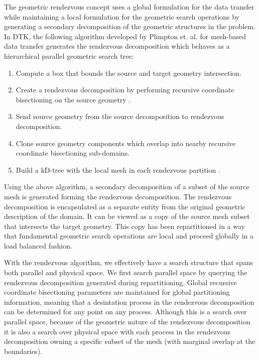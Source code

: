 \documentclass{mc2013}
\begin{document}
\label{subsec:rendezvous_algorithm}

The geometric rendezvous concept uses a global formulation for the
data transfer while maintaining a local formulation for the geometric
search operations by generating a secondary decomposition of the
geometric structures in the problem. In DTK, the following algorithm
developed by Plimpton et. al. \cite{Plimpton_2004} for mesh-based data
transfer generates the rendezvous decomposition which behaves as a
hierarchical parallel geometric search tree:
\begin{enumerate}
\item Compute a box that bounds the source and target geometry
  intersection.
\item Create a rendezvous decomposition by performing recursive
  coordinate bisectioning on the source geometry \cite{Berger_1987}.
\item Send source geometry from the source decomposition to rendezvous
  decomposition.
\item Clone source geometry components which overlap into nearby
  recursive coordinate bisectioning sub-domains.
\item Build a kD-tree with the local mesh in each rendezvous
  partition \cite{Bentley_1975}.
\end{enumerate}
Using the above algorithm, a secondary decomposition of a subset of
the source mesh is generated forming the rendezvous decomposition. The
rendezvous decomposition is encapsulated as a separate entity from the
original geometric description of the domain. It can be viewed as a
copy of the source mesh subset that intersects the target
geometry. This copy has been repartitioned in a way that fundamental
geometric search operations are local and proceed globally in a load
balanced fashion.

With the rendezvous algorithm, we effectively have a search structure
that spans both parallel and physical space. We first search parallel
space by querying the rendezvous decomposition generated during
repartitioning. Global recursive coordinate bisectioning parameters
are maintained for global partitioning information, meaning that a
desintation process in the rendezvous decomposition can be determined
for any point on any process. Although this is a search over parallel
space, because of the geometric nature of the rendezvous decomposition
it is also a search over physical space with each process in the
rendezvous decomposition owning a specific subset of the mesh (with
marginal overlap at the boundaries).
 
\end{document}

